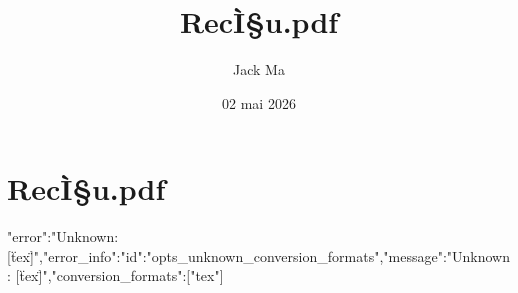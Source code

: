 \documentclass[12pt,a4paper]{article}
\title{RecÌ§u.pdf}
\author{Jack Ma}
\date{02 mai 2026}
\begin{document}
\maketitle

\section*{RecÌ§u.pdf}
{"error":"Unknown: [\"tex\"]","error_info":{"id":"opts_unknown_conversion_formats","message":"Unknown: [\"tex\"]","conversion_formats":["tex"]}}
\end{document}
